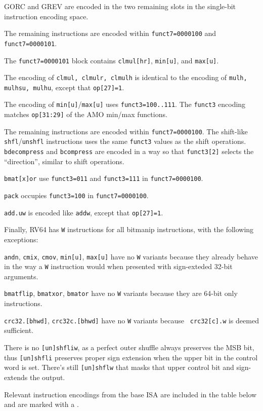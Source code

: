 GORC and GREV are encoded in the two remaining slots in the single-bit
instruction encoding space.

The remaining instructions are encoded within {\tt funct7=0000100} and
{\tt funct7=0000101}.

The {\tt funct7=0000101} block contains {\tt clmul[hr]},
{\tt min[u]}, and {\tt max[u]}.

The encoding of {\tt clmul, clmulr, clmulh} is identical to the encoding of
{\tt mulh, mulhsu, mulhu}, except that {\tt op[27]=1}.

The encoding of {\tt min[u]}/{\tt max[u]} uses {\tt funct3=100..111}. The
{\tt funct3} encoding matches {\tt op[31:29]} of the AMO min/max functions.

The remaining instructions are encoded within {\tt funct7=0000100}. The
shift-like {\tt shfl}/{\tt unshfl} instructions uses the same {\tt funct3}
values as the shift operations. {\tt bdecompress} and {\tt bcompress} are encoded in a
way so that {\tt funct3[2]} selects the ``direction'', similar to shift
operations.

{\tt bmat[x]or} use {\tt funct3=011} and {\tt funct3=111} in {\tt funct7=0000100}.

{\tt pack} occupies {\tt funct3=100} in {\tt funct7=0000100}.

{\tt add.uw} is encoded like {\tt addw}, except that {\tt op[27]=1}.

Finally, RV64 has {\tt *W} instructions for all bitmanip instructions, with the
following exceptions:

{\tt andn}, {\tt cmix}, {\tt cmov}, {\tt min[u]}, {\tt max[u]} have no {\tt *W}
variants because they already behave in the way a {\tt *W} instruction would
when presented with sign-exteded 32-bit arguments.

{\tt bmatflip}, {\tt bmatxor}, {\tt bmator} have no {\tt *W} variants because
they are 64-bit only instructions.

{\tt crc32.[bhwd]}, {\tt crc32c.[bhwd]} have no {\tt *W} variants because {\tt
crc32[c].w} is deemed sufficient.

There is no {\tt [un]shfliw}, as a perfect outer shuffle always preserves the
MSB bit, thus {\tt [un]shfli} preserves proper sign extension when the
upper bit in the control word is set. There's still {\tt [un]shflw} that
masks that upper control bit and sign-extends the output.

Relevant instruction encodings from the base ISA are included in the table below
and are marked with a {\tt *}.

